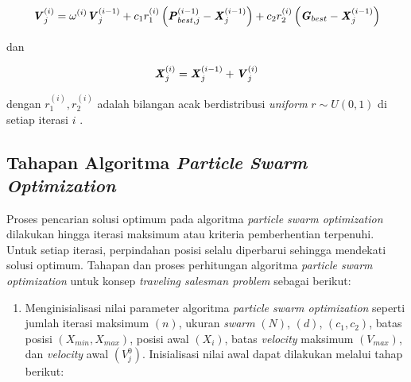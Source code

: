 {{\begin{equation}
    \label{pers: velocity update}
    \textbf{\textit{V}}_{j}^{(i)} = \omega^{(i)} \textbf{\textit{V}}_{j}^{(i-1)} + c_{1}r_{1}^{(i)}\left(\textbf{\textit{P}}_{best,j}^{(i-1)} - \textbf{\textit{X}}_{j}^{(i-1)}\right) + c_{2}r_{2}^{(i)} \left(\textbf{\textit{G}}_{best}-\textbf{\textit{X}}_{j}^{(i-1)}\right)
\end{equation}

\noindent
dan

\begin{equation}
    \label{pers: position update}
    \textbf{\textit{X}}_{j}^{(i)} = \textbf{\textit{X}}_{j}^{(i-1)} + \textbf{\textit{V}}_{j}^{(i)}
\end{equation}

\noindent
dengan $r_{1}^{(i)},r_{2}^{(i)}$ adalah bilangan acak berdistribusi \textit{uniform} $r \sim U(0,1)$ di setiap iterasi $i$ .
}

\vspace{-5mm}
\subsection{Tahapan Algoritma \textit{Particle Swarm Optimization}}
{\frenchspacing
    Proses pencarian solusi optimum pada algoritma \textit{particle swarm optimization} dilakukan hingga iterasi maksimum atau kriteria pemberhentian terpenuhi.
    Untuk setiap iterasi, perpindahan posisi selalu diperbarui sehingga mendekati solusi optimum.
    Tahapan dan proses perhitungan algoritma \textit{particle swarm optimization} untuk konsep \textit{traveling salesman problem} sebagai berikut:

    \begin{enumerate}[align = left, left = 0cm, nolistsep]
        \item Menginisialisasi nilai parameter algoritma \textit{particle swarm optimization} seperti jumlah iterasi maksimum $(n)$, ukuran \textit{swarm} $(N)$, $(d)$, $(c_{1},c_{2})$,
              batas posisi $(X_{min},X_{max})$, posisi awal $(X_{i})$, batas \textit{velocity} maksimum $(V_{max})$, dan \textit{velocity} awal $(V_{j}^{0})$.
              Inisialisasi nilai awal dapat dilakukan melalui tahap berikut:


\end{enumerate}}}
